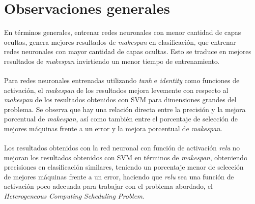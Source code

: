\section{Observaciones generales}

\paragraph{} En términos generales, entrenar redes neuronales con menor cantidad de capas ocultas, genera mejores resultados de \textit{makespan} en clasificación, que entrenar redes neuronales con mayor cantidad de capas ocultas. Esto se traduce en mejores resultados de \textit{makespan} invirtiendo un menor tiempo de entrenamiento. 

\paragraph{} Para redes neuronales entrenadas utilizando \textit{tanh} e \textit{identity} como funciones de activación, el \textit{makespan} de los resultados mejora levemente con respecto al \textit{makespan} de los resultados obtenidos con SVM para dimensiones grandes del problema. Se observa que hay una relación directa entre la precisión y la mejora porcentual de \textit{makespan}, así como también entre el porcentaje de selección de mejores máquinas frente a un error y la mejora porcentual de \textit{makespan}. 

\paragraph{} Los resultados obtenidos con la red neuronal con función de activación \textit{relu} no mejoran los resultados obtenidos con SVM en términos de \textit{makespan}, obteniendo precisiones en clasificación similares, teniendo un porcentaje menor de selección de mejores máquinas frente a un error, haciendo que \textit{relu} sea una función de activación poco adecuada para trabajar con el problema abordado, el \textit{Heterogeneous Computing Scheduling Problem}. 
